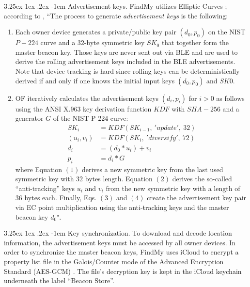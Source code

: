 \documentclass[english]{article}
\makeatletter
\renewcommand\paragraph{\@startsection{paragraph}{5}{\z@}%
  {3.25ex \@plus1ex \@minus.2ex}%
  {-1em}%
  {\normalfont\normalsize\bfseries}}
\makeatother
\begin{document}
\paragraph{Advertisement keys.}\label{keys}
FindMy utilizes Elliptic Curves \cite{ec}; according to \cite{aps,whocanfind}, ``The process to generate \textit{advertisement keys} is the following:
\begin{enumerate}
  \item Each owner device generates a private/public key pair
  $(d_0, p_0)$ on the NIST $P-224$ curve and a $32$-byte symmetric key $SK_0$ that together form the master beacon key. Those keys are never sent out via BLE and are used to derive the rolling advertisement keys included in the BLE advertisements. Note that device tracking is hard since rolling keys can be deterministically derived if and only if one knows the initial input keys $(d_0, p_0)$ and $SK0$.
  \item OF iteratively calculates the advertisement keys $(d_i,p_i)$ for $i > 0$ as follows using the ANSI X.963 key derivation
  function $KDF$ \cite{ANSI} with $SHA-256$ \cite{sha} and a generator $G$ of the NIST P-224 curve:
  \begin{align}
    SK_i &= KDF(SK_{i-1},\ 'update',\ 32) \\
    (u_i, v_i) &= KDF(SK_i,\ 'diversify',\ 72) \\
    d_i &= (d_0 * u_i) + v_i \\
    p_i &= d_i * G
  \end{align}
  where Equation $(1)$ derives a new symmetric key from the last used symmetric key with 32 bytes length. Equation $(2)$ derives the so-called “anti-tracking” keys $u_i$ and $v_i$ from the new symmetric key with a length of $36$ bytes each. Finally, Eqs. $(3)$ and $(4)$ create the advertisement key pair via EC point multiplication using the anti-tracking keys and the master beacon key $d_0$".
\end{enumerate}

\paragraph{Key synchronization.}
To download and decode location information, the advertisement keys must be accessed by all owner devices. In order to synchronize the master beacon keys, FindMy uses iCloud to encrypt a property list file in the Galois/Counter mode of the Advanced Encryption Standard (AES-GCM) \cite{gcm}. The file's decryption key is kept in the iCloud keychain underneath the label “Beacon Store”.
\end{document}
